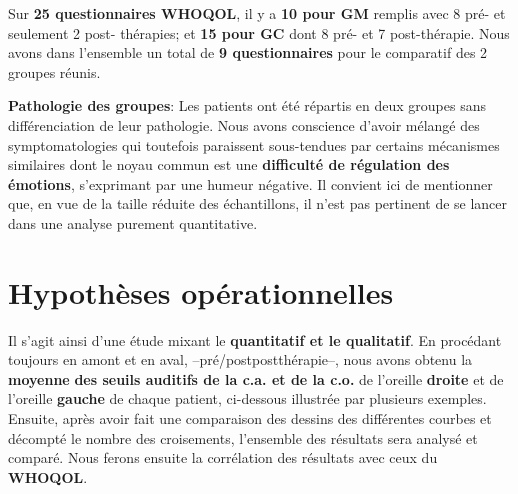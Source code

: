 Sur \textbf{25 questionnaires WHOQOL}, il y a \textbf{10 pour GM} remplis
avec 8 pré- et seulement 2
     post- thérapies; et \textbf{15 pour GC} dont 8 pré-
     et 7 post-thérapie.
      Nous avons dans l'ensemble un total de \textbf{9 questionnaires} pour le
     comparatif des 2 groupes réunis.

\textbf{ Pathologie des groupes}: Les patients ont été répartis en deux groupes sans différenciation de
 leur pathologie. Nous avons conscience d'avoir mélangé des symptomatologies qui
 toutefois paraissent
 sous-tendues par
                                               certains mécanismes
                                               similaires dont le
                                               noyau commun est une
                                              \textbf{difficulté de
                                               régulation des
                                               émotions},
                                               s'exprimant par une
                                               humeur négative.
                                               Il convient ici de mentionner que, en vue de la taille réduite des échantillons, il n'est pas
pertinent de se lancer dans une analyse purement
quantitative.

\section{Hypothèses opérationnelles}

Il s'agit ainsi d'une étude mixant le \textbf{quantitatif  et le
  qualitatif}.
En procédant toujours en amont et en aval, --pré/postpostthérapie--, nous
avons obtenu la \textbf{moyenne} \textbf{des seuils
auditifs de la c.a. et de la c.o.} de l'oreille \textbf{droite} et de
l'oreille \textbf{gauche} de chaque patient, ci-dessous illustrée par
plusieurs exemples. Ensuite, après avoir
fait une comparaison des dessins des différentes courbes et
décompté le nombre des croisements, l'ensemble des résultats sera analysé et comparé.
Nous ferons ensuite la corrélation des résultats avec ceux du\textbf{
  WHOQOL}.

